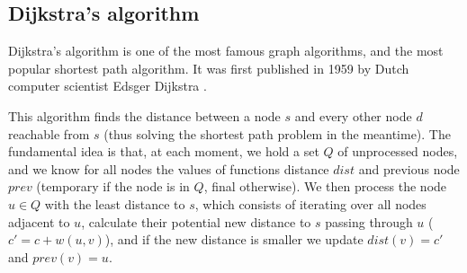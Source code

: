 \subsection{Dijkstra's algorithm} \label{algorithm-shortestpath-dijkstra}
Dijkstra's algorithm is one of the most famous graph algorithms, and the most popular shortest path algorithm. It was first published in 1959 by Dutch computer scientist Edsger Dijkstra \cite{dijkstra}.\par
This algorithm finds the distance between a node $s$ and every other node $d$ reachable from $s$ (thus solving the shortest path problem in the meantime). The fundamental idea is that, at each moment, we hold a set $Q$ of unprocessed nodes, and we know for all nodes the values of functions distance $dist$ and previous node $prev$ (temporary if the node is in $Q$, final otherwise). We then process the node $u \in Q$ with the least distance to $s$, which consists of iterating over all nodes adjacent to $u$, calculate their potential new distance to $s$ passing through $u$ ($c'=c+w(u,v)$), and if the new distance is smaller we update $dist(v)=c'$ and $prev(v)=u$.
